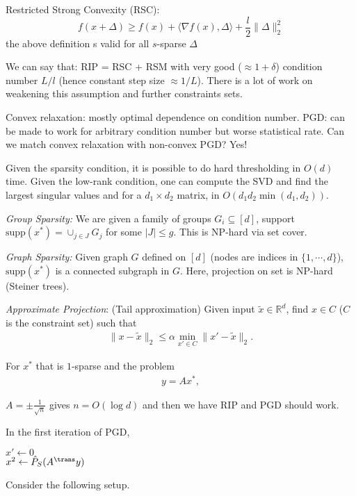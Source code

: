 \begin{definition}
Restricted Strong Convexity (RSC):
$$f(x+\Delta) \geq f(x) + \langle \nabla f(x), \Delta \rangle + \frac{l}{2} \| \Delta\|_2^2 $$
the above definition s valid for all $s$-sparse $\Delta$  
\end{definition}
We can say that:
RIP = RSC + RSM with very good ($\approx 1 + \delta$) condition number $L/l$ (hence constant step size $\approx 1/L$).
There is a lot of work on weakening this assumption and further constraints sets.

Convex relaxation: mostly optimal dependence on condition number.
PGD: can be made to work for arbitrary condition number but worse statistical rate.
Can we match convex relaxation with non-convex PGD? Yes!

Given the sparsity condition, it is possible to do hard thresholding in $O(d)$ time. Given the low-rank condition, one can compute the SVD and find the largest singular values and for a $d_1 \times d_2$ matrix, in $O(d_1 d_2 \min( d_1, d_2)).$


\emph{Group Sparsity:}
We are given a family of groups $G_i \subseteq [d]$, support $\text{supp}(x^*) = \cup_{j \in J} G_j$ for some $|J| \leq g.$ This is NP-hard via set cover. 


\emph{Graph Sparsity:}
Given graph $G$ defined on $[d]$ (nodes are indices in $\{ 1, \cdots, d\}$), $\text{supp}(x^*)$ is a connected subgraph in $G$. Here, projection on set is NP-hard (Steiner trees). 


\emph{Approximate Projection}:
(Tail approximation) Given input $\tilde{x} \in \mathbb{R}^d$, find $x \in C$ ($C$ is the constraint set) such that 
\begin{align*}
\|x - \tilde{x} \|_2 \leq \alpha \min_{x' \in C} \| x'- \tilde{x} \|_2. 
\end{align*}

For $x^*$ that is $1$-sparse and the problem
\begin{align*}
y = Ax^*,
\end{align*}

$A = \pm \frac{1}{\sqrt{n}}$ gives $n= O(\log d)$ and then we have RIP and PGD should work. 

In the first iteration of PGD, 
\begin{center}
$x' \leftarrow 0$ \\
$x^2 \leftarrow \hat{P}_S(A^{\trans} y)$
\end{center}


Consider the following setup. 

